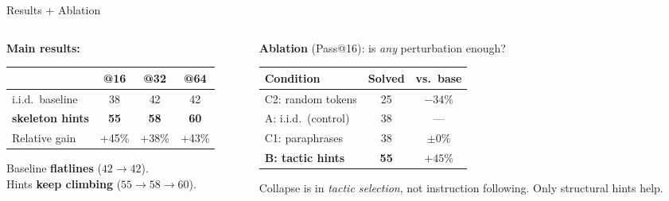 \documentclass[aspectratio=169, 11pt]{beamer}
\begin{document}
\begin{frame}{Results + Ablation}

\begin{columns}[T]
\begin{column}{0.46\textwidth}
\textbf{Main results:}

\vspace{0.2em}
{\small
\begin{tabular}{@{}lccc@{}}
\toprule
& @16 & @32 & @64 \\
\midrule
i.i.d.\ baseline & 38 & 42 & 42 \\
\textbf{skeleton hints} & \textbf{55} & \textbf{58} & \textbf{60} \\
\midrule
Relative gain & +45\% & +38\% & +43\% \\
\bottomrule
\end{tabular}
}

\vspace{0.3em}
Baseline \textbf{flatlines} ($42 \to 42$).\\
Hints \textbf{keep climbing} ($55 \to 58 \to 60$).
\end{column}
\begin{column}{0.50\textwidth}
\textbf{Ablation} (Pass@16): is \emph{any} perturbation enough?

\vspace{0.2em}
{\small
\begin{tabular}{@{}lcc@{}}
\toprule
Condition & Solved & vs.\ base \\
\midrule
C2: random tokens & 25 & \alert{$-34\%$} \\
A: i.i.d.\ (control) & 38 & --- \\
C1: paraphrases & 38 & $\pm 0\%$ \\
\textbf{B: tactic hints} & \textbf{55} & \textbf{$+45\%$} \\
\bottomrule
\end{tabular}
}

\vspace{0.3em}
Collapse is in \emph{tactic selection}, not instruction following. Only structural hints help.
\end{column}
\end{columns}
\end{frame}
\end{document}
